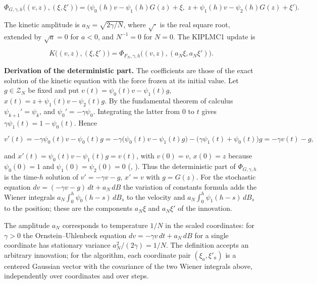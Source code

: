\documentclass[11pt,a4paper]{article}
\begin{document}
\[\Phi_{G,\gamma,h}\bigl((v,z),(\xi,\xi')\bigr)=\bigl(\psi_0(h)v-\psi_1(h)G(z)+\xi,\;z+\psi_1(h)v-\psi_2(h)G(z)+\xi'\bigr).\]


The kinetic amplitude is \(a_N=\sqrt{2\gamma/N}\), where \(\sqrt{\cdot}\) is the real square root, extended by \(\sqrt a=0\) for \(a<0\), and \(N^{-1}=0\) for \(N=0\). The KIPLMC1 update is


\[K\bigl((v,z),(\xi,\xi')\bigr)=\Phi_{F_N,\gamma,h}\bigl((v,z),(a_N\xi,a_N\xi')\bigr).\]


\textbf{Derivation of the deterministic part.} The coefficients are those of the exact solution of the kinetic equation with the force frozen at its initial value. Let \(g\in\mathcal Z_N\) be fixed and put \(v(t)=\psi_0(t)v-\psi_1(t)g\), \(x(t)=z+\psi_1(t)v-\psi_2(t)g\). By the fundamental theorem of calculus \(\psi_{k+1}'=\psi_k\), and \(\psi_0'=-\gamma\psi_0\). Integrating the latter from \(0\) to \(t\) gives \(\gamma\psi_1(t)=1-\psi_0(t)\). Hence


\[v'(t)=-\gamma\psi_0(t)v-\psi_0(t)g=-\gamma\bigl(\psi_0(t)v-\psi_1(t)g\bigr)-\bigl(\gamma\psi_1(t)+\psi_0(t)\bigr)g=-\gamma v(t)-g,\]


and \(x'(t)=\psi_0(t)v-\psi_1(t)g=v(t)\), with \(v(0)=v\), \(x(0)=z\) because \(\psi_0(0)=1\) and \(\psi_1(0)=\psi_2(0)=0\) (\cite[Section~3.12.1]{LangevinLean2026Kinetic}, \cite[Section~3.12.1]{LangevinLean2026Kinetic}). Thus the deterministic part of \(\Phi_{G,\gamma,h}\) is the time-\(h\) solution of \(v'=-\gamma v-g\), \(x'=v\) with \(g=G(z)\). For the stochastic equation \(dv=(-\gamma v-g)\,dt+a_N\,dB\) the variation of constants formula adds the Wiener integrals \(a_N\int_0^h\psi_0(h-s)\,dB_s\) to the velocity and \(a_N\int_0^h\psi_1(h-s)\,dB_s\) to the position; these are the components \(a_N\xi\) and \(a_N\xi'\) of the innovation.




The amplitude \(a_N\) corresponds to temperature \(1/N\) in the scaled coordinates: for \(\gamma>0\) the Ornstein–Uhlenbeck equation \(dv=-\gamma v\,dt+a_N\,dB\) for a single coordinate has stationary variance \(a_N^2/(2\gamma)=1/N\). The definition accepts an arbitrary innovation; for the algorithm, each coordinate pair \((\xi_a,\xi'_a)\) is a centered Gaussian vector with the covariance of the two Wiener integrals above, independently over coordinates and over steps.
\end{document}
